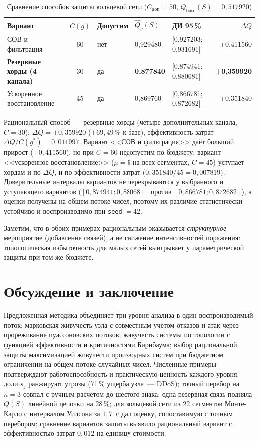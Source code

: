 \documentclass[12pt]{article}
\begin{document}
\begin{table}[htb]
\centering
\caption{Сравнение способов защиты кольцевой сети ($C_{\text{доп}} = 50$,
$Q_{\text{base}}(S) = 0{,}517920$)}
\label{tab:protection-ring}
{\footnotesize
\begin{tabular}{@{}lclllr@{}}
\toprule
Вариант & $C(g)$ & Допустим & $\hat Q_g(S)$ & ДИ 95\,\% & $\Delta Q$ \\
\midrule
СОВ и фильтрация & 60 & нет & 0{,}929480 &
[0{,}927203; 0{,}931691] & +0{,}411560 \\
\textbf{Резервные хорды (4 канала)} & 30 & да & \textbf{0{,}877840} &
[0{,}874941; 0{,}880681] & \textbf{+0{,}359920} \\
Ускоренное восстановление & 45 & да & 0{,}869760 &
[0{,}866781; 0{,}872682] & +0{,}351840 \\
\bottomrule
\end{tabular}}
\end{table}

Рациональный способ~--- резервные хорды (четыре дополнительных канала,
$C = 30$): $\Delta Q = +0{,}359920$ ($+69{,}49\,\%$ к базе),
эффективность затрат $\Delta Q / C(g^{*}) = 0{,}011997$. Вариант
<<СОВ и фильтрация>> даёт больший прирост ($+0{,}411560$), но при $C = 60$
недопустим по бюджету; вариант <<ускоренное восстановление>>
($\mu = 6$ на всех сегментах, $C = 45$) уступает хордам и по $\Delta Q$,
и по эффективности затрат ($0{,}351840/45 = 0{,}007819$). Доверительные
интервалы вариантов не перекрываются у выбранного и уступающего вариантов
($[0{,}874941; 0{,}880681]$ против $[0{,}866781; 0{,}872682]$), а оценки
получены на общем потоке чисел, поэтому их различие статистически
устойчиво и воспроизводимо при \texttt{seed} $= 42$.

Заметим, что в обоих примерах рациональным оказывается \emph{структурное}
мероприятие (добавление связей), а не снижение интенсивностей поражения:
топологическая избыточность для малых сетей выигрывает у параметрической
защиты при том же бюджете.

\section{Обсуждение и заключение}

Предложенная методика объединяет три уровня анализа в один воспроизводимый
поток: марковская живучесть узла с совместным учётом отказов и атак
через прореживание пуассоновских потоков; живучесть системы по топологии
с функцией эффективности и критичностями Бирнбаума; выбор рациональной
защиты максимизацией живучести производных систем при бюджетном
ограничении на общем потоке случайных чисел. Численные примеры подтверждают
работоспособность и практическую ценность каждого уровня: доли $s_j$
ранжируют угрозы (71\,\% ущерба узла~--- DDoS); точный перебор на $n = 3$
совпал с ручным расчётом до шестого знака; одна резервная связь подняла
$Q(S)$ линейной цепочки на 28\,\%; для кольцевой сети из 22 сегментов
Монте-Карло с интервалом Уилсона за $1{,}7$~с дал оценку, сопоставимую с
точным перебором; сравнение вариантов защиты выявило рациональный вариант
с эффективностью затрат $0{,}012$ на единицу стоимости.
\end{document}
